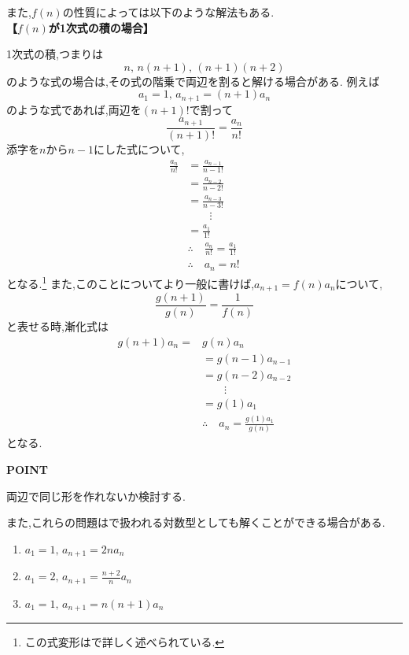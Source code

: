また,$f(n)$の性質によっては以下のような解法もある.\\
\noindent{}\label{解法：階比型の1次式の積}\textbf{【$f(n)$が1次式の積の場合】}

1次式の積,つまりは
\[
  n,\, n(n+1), \,(n+1)(n+2)
\]
のような式の場合は,その式の階乗で両辺を割ると解ける場合がある.
例えば
\[
  a_1=1,\,a_{n+1}=(n+1)a_n
\]
のような式であれば,両辺を$(n+1)!$で割って
\[
  \frac{a_{n+1}}{(n+1)!}=\frac{a_n}{n!}
\]
添字を$n$から$n-1$にした式について,
\begin{align*}
  \frac{a_{n}}{n!}&=\frac{a_{n-1}}{{n-1}!}\\
  &=\frac{a_{n-2}}{{n-2}!}\\
  &=\frac{a_{n-3}}{{n-3}!}\\
  &\qquad \vdots\\
  &=\frac{a_1}{1!}\\
  &\therefore \quad \frac{a_{n}}{n!}=\frac{a_1}{1!}\\
  &\therefore \quad a_n=n!
\end{align*}
となる.\footnote{この式変形はで詳しく述べられている.}
また,このことについてより一般に書けば,$a_{n+1}=f(n)a_n$について,
\[
  \frac{g(n+1)}{g(n)}=\frac{1}{f(n)}
\]
と表せる時,漸化式は
\begin{align*}
  g(n+1)a_{n}=&g(n)a_n\\
  &=g(n-1)a_{n-1}\\
  &=g(n-2)a_{n-2}\\
  &\qquad \vdots\\
  &=g(1)a_1\\
  &\therefore \quad a_n=\frac{g(1)a_1}{g(n)}
\end{align*}
となる.

\begin{bookpoint}
  \textbf{POINT}\par
  両辺で同じ形を作れないか検討する.
\end{bookpoint}

また,これらの問題はで扱われる対数型としても解くことができる場合がある.

\noindent {}\par\nobreak
\begin{enumerate}[label=(\arabic*),parsep=3pt,format=\bookitemlink{example-ratio-1}{problem}{answer}]
  \item $\displaystyle a_1=1,\, a_{n+1}=2na_n$
  \item $\displaystyle a_1=2,\, a_{n+1}=\frac{n+2}{n}a_n$
  \item $\displaystyle a_1=1,\, a_{n+1}=n(n+1)a_n$
\end{enumerate}


